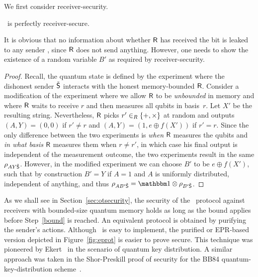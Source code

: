 We first consider receiver-security. 
\begin{proposition}\label{prop:sec:receiverprivate}
\qot\ is perfectly receiver-secure.
\end{proposition}
It is obvious that no information about whether ${\sf R}$ has received the
bit is leaked to any sender \smash{$\dA$}, since ${\sf R}$ does not send
anything. However, one needs to show the existence of a random
variable $B'$ as required by receiver-security.
\begin{proof}
  Recall, the quantum state  is defined by the
  experiment where the dishonest sender $\dA$ interacts with the
  honest memory-bounded ${\sf R}$. Consider a modification of the
  experiment where we allow ${\sf R}$ to be {\em unbounded} in memory and
  where ${\sf R}$ waits to receive $r$ and then measures all qubits in
  basis~$r$. Let $X'$ be the resulting string. Nevertheless, ${\sf R}$
  picks $r' \in_R \{+,\times\}$ at random and outputs $(A,Y) =
  (0,0)$ if $r' \neq r$ and $(A,Y) = (1,e \oplus f(X'))$ if $r' = r$.
  Since the only difference between the two experiments is {\em when}
  ${\sf R}$ measures the qubits and {\em in what basis} ${\sf R}$ measures them
  when $r \neq r'$, in which case his final output is independent of
  the measurement outcome, the two experiments result in the same
  $\rho_{AY\tilde{\sf S}}$. However, in the modified experiment we can choose
  $B'$ to be $e \oplus f(X')$, such that by construction $B' = Y$ if
  $A=1$ and $A$ is uniformly distributed, independent of anything, and
  thus $\rho_{AB'\dA} = \I \otimes \rho_{B'\dA}$.
\end{proof}


As we shall see in Section~\ref{sec:otsecurity}, the security of the
\qot\ protocol against receivers with bounded-size quantum memory
holds as long as the bound applies before Step~\ref{bound} is reached.
An equivalent protocol is obtained by purifying the sender's actions.
Although \qot\ is easy to implement, the purified or EPR-based version
depicted in Figure~\ref{fig:eprot} is easier to prove secure. This
technique was pioneered by Ekert~\cite{Ekert91} in the scenario of
quantum key distribution. A similar approach was taken in the
Shor-Preskill proof of security for the BB84 quantum-key-distribution
scheme~\cite{SP00}.  

